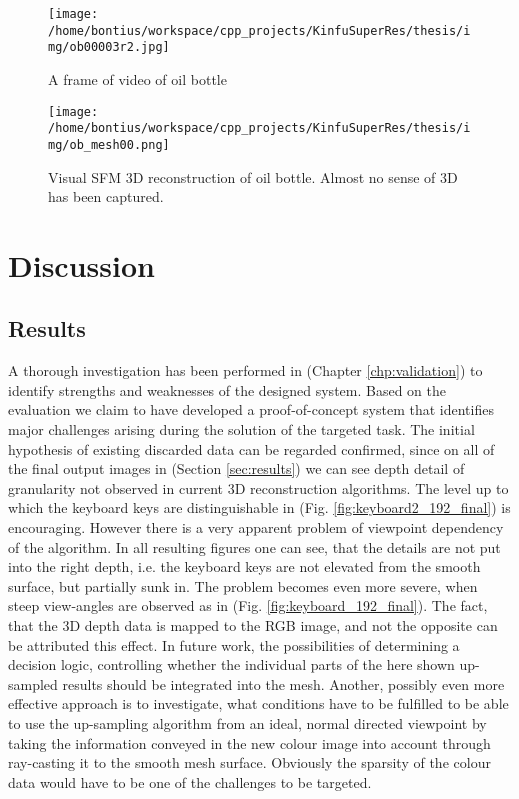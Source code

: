 \documentclass{ucl_thesis}
\newcommand{\figref}[1]{(Fig. \ref{#1})}
\newcommand{\secref}[1]{(Section \ref{#1})}
\newcommand{\chpref}[1]{(Chapter \ref{#1})}
\begin{document}
\begin{figure}[h!]\centering
	\begin{minipage}[b]{0.49\linewidth}\centering
		\texttt{[image: /home/bontius/workspace/cpp\_projects/KinfuSuperRes/thesis/img/ob00003r2.jpg]}
		\caption{A frame of video of oil bottle}
		\label{fig:ob_1}
	\end{minipage}
	\begin{minipage}[b]{0.49\linewidth}\centering
		\texttt{[image: /home/bontius/workspace/cpp\_projects/KinfuSuperRes/thesis/img/ob\_mesh00.png]}
		\caption{Visual SFM 3D reconstruction of oil bottle. Almost no sense of 3D has been captured.}
		\label{fig:ob_mesh}
	\end{minipage}
\end{figure}



\chapter{Discussion} 
\label{chp:discussion}

\section{Results}
\label{sec:discussion_results}

\par A thorough investigation has been performed in \chpref{chp:validation} to identify strengths and weaknesses of the designed system. Based on the evaluation we claim to have developed a proof-of-concept system that identifies major challenges arising during the solution of the targeted task. The initial hypothesis of existing discarded data can be regarded confirmed, since on all of the final output images in \secref{sec:results} we can see depth detail of granularity not observed in current 3D reconstruction algorithms. The level up to which the keyboard keys are distinguishable in \figref{fig:keyboard2_192_final} is encouraging. However there is a very apparent problem of viewpoint dependency of the algorithm. In all resulting figures one can see, that the details are not put into the right depth, i.e. the keyboard keys are not elevated from the smooth surface, but partially sunk in. The problem becomes even more severe, when steep view-angles are observed as in \figref{fig:keyboard_192_final}. The fact, that the 3D depth data is mapped to the RGB image, and not the opposite can be attributed this effect. In future work, the possibilities of determining a decision logic, controlling whether the individual parts of the here shown up-sampled results should be integrated into the mesh. Another, possibly even more effective approach is to investigate, what conditions have to be fulfilled to be able to use the up-sampling algorithm from an ideal, normal directed viewpoint by taking the information conveyed in the new colour image into account through ray-casting it to the smooth mesh surface. Obviously the sparsity of the colour data would have to be one of the challenges to be targeted.
\end{document}
